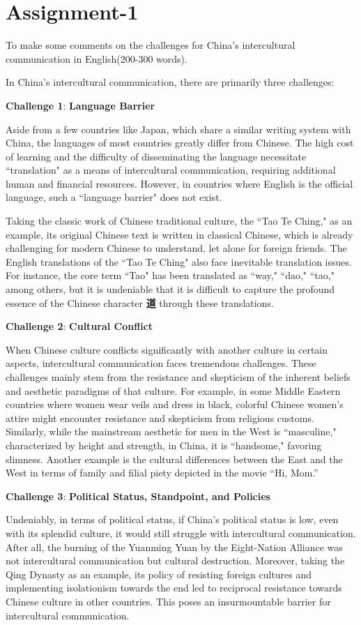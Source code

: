 \section{Assignment-1}

\begin{question}{}{}
    To make some comments on the challenges for China's intercultural communication in English(200-300 words).
\end{question}

In China's intercultural communication, there are primarily three challenges:

\textbf{Challenge 1}: \textbf{Language Barrier}

Aside from a few countries like Japan, which share a similar writing system with China, the languages of most countries greatly differ from Chinese. The high cost of learning and the difficulty of disseminating the language necessitate ``translation" as a means of intercultural communication, requiring additional human and financial resources. However, in countries where English is the official language, such a ``language barrier" does not exist.

Taking the classic work of Chinese traditional culture, the ``Tao Te Ching," as an example, its original Chinese text is written in classical Chinese, which is already challenging for modern Chinese to understand, let alone for foreign friends. The English translations of the ``Tao Te Ching" also face inevitable translation issues. For instance, the core term ``Tao" has been translated as ``way," ``dao," ``tao," among others, but it is undeniable that it is difficult to capture the profound essence of the Chinese character \textbf{道} through these translations.

\textbf{Challenge 2}: \textbf{Cultural Conflict}

When Chinese culture conflicts significantly with another culture in certain aspects, intercultural communication faces tremendous challenges. These challenges mainly stem from the resistance and skepticism of the inherent beliefs and aesthetic paradigms of that culture. For example, in some Middle Eastern countries where women wear veils and dress in black, colorful Chinese women's attire might encounter resistance and skepticism from religious customs. Similarly, while the mainstream aesthetic for men in the West is ``masculine," characterized by height and strength, in China, it is ``handsome," favoring slimness. Another example is the cultural differences between the East and the West in terms of family and filial piety depicted in the movie ``Hi, Mom.''

\textbf{Challenge 3}: \textbf{Political Status, Standpoint, and Policies}

Undeniably, in terms of political status, if China's political status is low, even with its splendid culture, it would still struggle with intercultural communication. After all, the burning of the Yuanming Yuan by the Eight-Nation Alliance was not intercultural communication but cultural destruction. Moreover, taking the Qing Dynasty as an example, its policy of resisting foreign cultures and implementing isolationism towards the end led to reciprocal resistance towards Chinese culture in other countries. This poses an insurmountable barrier for intercultural communication.
